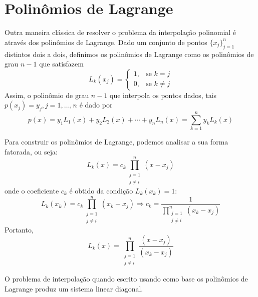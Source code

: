 \section{Polinômios de Lagrange}
Outra maneira clássica de resolver o problema da interpolação polinomial é através dos polinômios de Lagrange. Dado um conjunto de pontos $\{x_j\}_{j=1}^n$ distintos dois a dois, definimos os polinômios de Lagrange como os polinômios de grau $n-1$ que satisfazem
$$
L_k(x_j)=\left\{\begin{array}{rl}
1,& \text{se }k=j\\
0,& \text{se }k\neq j
\end{array}
\right.
$$
Assim, o polinômio de grau $n-1$ que interpola os pontos dados, tais $p(x_j)=y_j, j=1,\ldots,n$ é dado por
$$p(x)=y_1L_1(x)+y_2L_2(x)+\cdots +y_nL_n(x)=\sum_{k=1}^n y_k L_k(x)$$

Para construir os polinômios de Lagrange, podemos analisar a sua forma fatorada, ou seja:
$$L_k(x)=c_k\prod_{\substack{j=1\\j\ne i}}^{n} (x-x_j)$$
onde o coeficiente $c_k$ é obtido da condição $L_k(x_k)=1$:
$$L_k(x_k)=c_k\prod_{\substack{j=1\\j\ne i}}^{n} (x_k-x_j) \Longrightarrow  c_k=\frac{1}{\displaystyle \prod_{\substack{j=1\\j\ne i}}^{n} (x_k-x_j)}$$
Portanto,
$$L_k(x)=\prod_{\substack{j=1\\j\ne i}}^{n} \frac{(x-x_j)}{(x_k-x_j)}$$

\begin{obs} O problema de interpolação quando escrito usando como base os polinômios de Lagrange produz um sistema linear diagonal.
\end{obs}

